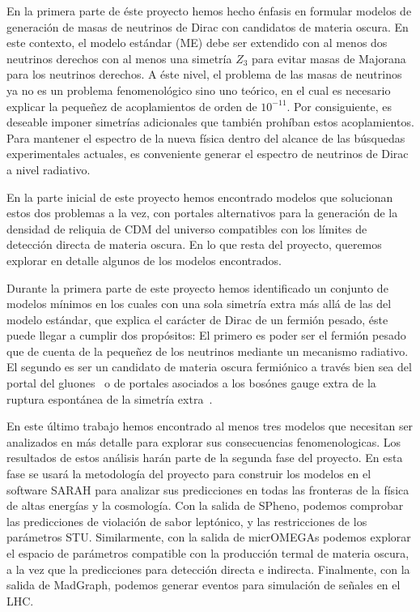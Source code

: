 En la primera parte de éste proyecto hemos hecho énfasis en formular
modelos de generación de masas de neutrinos de Dirac con candidatos de
materia oscura. En este contexto, el modelo estándar (ME) debe ser
extendido con al menos dos neutrinos derechos con al menos una
simetría $Z_3$ para evitar masas de Majorana para los neutrinos
derechos.
A éste nivel, el problema de las masas de neutrinos ya no es un
problema fenomenológico sino uno teórico, en el cual es necesario
explicar la pequeñez de acoplamientos de orden de $10^{-11}$. Por
consiguiente, es deseable imponer simetrías adicionales que también
prohíban estos acoplamientos. Para mantener el espectro de la nueva
física dentro del alcance de las búsquedas experimentales actuales,
es conveniente generar el espectro de neutrinos de Dirac a nivel
radiativo.

En la parte inicial de este proyecto hemos encontrado modelos que
solucionan estos dos problemas a la vez, con portales alternativos
para la generación de la densidad de reliquia de CDM del universo
compatibles con los límites de detección directa de materia oscura.
En lo que resta del proyecto, queremos explorar en detalle algunos de
los modelos encontrados.


Durante la primera parte de este proyecto hemos identificado un
conjunto de modelos mínimos en los cuales con una sola simetría extra
más allá de las del modelo estándar, que explica el carácter de Dirac de un
fermión pesado, éste puede llegar a cumplir dos propósitos: El primero
es poder ser el fermión pesado que de cuenta de la pequeñez de los
neutrinos mediante un mecanismo radiativo. El segundo es ser un candidato
de materia oscura fermiónico a través bien sea del portal del gluones~\cite{Reig:2018ztc,Reig:2018mdk}
o de portales asociados a los  bosónes gauge extra de la ruptura
espontánea de la simetría extra~\cite{Bernal:2018aon,Calle:2018ovc,Abdullah:2018ets}.

En este último trabajo hemos encontrado al menos tres modelos que
necesitan ser analizados en más detalle para explorar sus
consecuencias fenomenologicas. Los resultados de estos análisis harán 
parte de la segunda fase del proyecto.
En esta fase se usará la metodología del proyecto para construir los
modelos en el software SARAH para analizar sus predicciones en todas
las fronteras de la física de altas energías y la cosmología. Con la
salida de SPheno, podemos comprobar las predicciones de violación de
sabor leptónico, y las restricciones de los parámetros STU.
Similarmente, con la salida de micrOMEGAs podemos explorar el espacio
de parámetros compatible con la producción termal de materia oscura, a
la vez que la predicciones para detección directa e
indirecta. Finalmente, con la salida de MadGraph, podemos generar
eventos para simulación de señales en el LHC.

